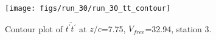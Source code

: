 \begin{figure}[H]
\centering
\texttt{[image: figs/run\_30/run\_30\_tt\_contour]}
\caption{Contour plot of $\overline{t^\prime t^\prime}$ at $z/c$=7.75, $V_{free}$=32.94, station 3.}
\label{fig:run_30_tt_contour}
\end{figure}


